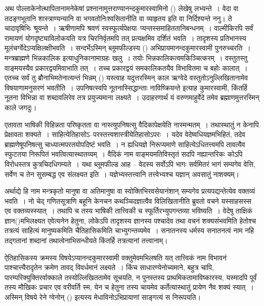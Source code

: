 अथ पोल्लाकेनोत्थापितानामनेकेषां प्रश्नानामुत्तराण्यानन्दकुमारस्वामिनो () लेखेषु लभ्यन्ते~। वेदा वा तदङ्गभूतानि शास्त्राण्यन्यानि वा भगवतो\break निःश्वसितानीति वा व्याहृतय इति वा निर्दिश्यन्ते ननु। ते चादावृषिभिः श्रूयन्ते~। ऋषीणामपि श्रवणं स्वस्फूर्त्यपेक्षया–प्यन्तस्समाहिततानिबन्धनम्~। वाल्मीकिरपि सर्वं रामायणं योगदृष्ट्या\break विलोकयति यत्र चिरनिर्वृतमपि तत् प्रत्यक्षमिव दर्शितं भवति~। तादृशस्य प्रतिभानस्य मूलं\break चर्ग्वेदेऽप्यक्षिलक्षीभवति~। सन्दर्भेऽस्मिन् ब्लूमफील्डस्य () अभिप्रायमानन्दकुमारस्वामी पुनरुच्चरति~। मन्त्रब्राह्मणे भिन्नकालिक इत्याधुनिकानामाग्रहः खलु~। तयोः भिन्नकालिकत्वमकिञ्चित्करम्~। वस्तुतस्तु वाङ्मयस्यैव प्रकारद्वयमिवाभाति तत्~। तच्च प्रकारद्वयं समकालिकतयैव विभावितमा च बहोः कालात्~। एतच्च सर्वं तु ब्रौनाभिमतेनात्यन्तं भिन्नम् () यस्त्वाह यदुत्तरस्मिन् काल ऋग्वेदे वस्तुतोऽनुल्लिखितानामेव विषयाणामनुसरणं भवतीति~। उपनिषत्स्वपि नूतनास्सिद्धान्ताः नाविष्क्रियन्ते इत्याह कुमारस्वामी, किंतर्हि नूतना विभिन्ना वा शब्दावलिरेव तत्र प्रयुज्यमाना लक्ष्यते~। उदाहरणार्थं यं वरुणमाहुर्वेदे तमेव ब्रह्माणमुत्तरस्मिन् काले जगदुः।

एतावता भाषिकी विहिन्नता परिष्कृतता वा नास्त्युपनिषत्सु वैदिकापेक्षयेति नास्मन्मतम्~। तथास्थातुं न केनापि प्रेक्षावता शक्यते~। साहित्येतिहासोऽ–परस्तत्त्वशास्त्रीयेतिहासोऽपरः~। यदेव वेदेष्वधियज्ञमभिहितं, तदेव ब्राह्मणेषूपनिषत्सु चाध्यात्मपरतयोपदिष्टं भवति~। न ह्यधियज्ञे निरूप्यमाणे साहित्येऽधितत्त्वमपि तावत्यैव स्फुटतया निरूपितं भवत्वित्यास्थातव्यम्~। वैदिकं नाम वाङ्मयमतिविस्तृतं सदपि नह्यान्तरिकः कोऽपि विरोधस्तत्र कुत्रचिदधिगम्यते~। यथा ब्लूमफील्ड आह – वेदस्य सर्वोऽपि भागः सर्वमितरं भागं सम्यगेव वेत्ति, सर्वेण च तेन सुसम्बद्ध एव संलक्ष्यत इति~। यज्ञेभ्यस्तत्त्वानि तत्त्वेभ्यश्च यज्ञान् अवसातुं नाशक्यम्।

अर्थाद्ये हि नाम मन्त्रकृतो मानुषा वा अतिमानुषा वा स्वोक्तिभिरवसेयानंशान् सम्यगेव प्रत्यपद्यन्तेत्येव वक्तव्यं भवति~। नो चेद् गणितसूत्राणि बहूनि केनचन कथञ्चिदज्ञात्वैव विलिखितानीति ब्रुवतो वचने यस्साहसस्स एव वक्तव्यस्स्यात्~। तथापि च तस्य भाषिकी तात्त्विकी च स्फूर्तिरभ्युपगन्तव्या भविष्यति~। वेदेषु ताक्षिकं ज्ञान()मभिलक्ष्यत एवेत्यनेन हेतुना, लोकेऽपि तादृशस्य ज्ञानस्य पश्चादेव तथा वचनं शक्यसंभवमिति हेतोश्च तत्रत्यं साहित्यं मानुष्यकमिति चैतिहासिकमिति चाभ्युगन्तव्यमेव~। सनातनस्य धर्मस्य सनातनत्वं नाम नहि तद्गतानां शब्दानां तथात्वेनाभिसन्धीयते किंतर्हि तत्रत्यानां तत्त्वानाम्।

ऐतिहासिकस्य क्रमस्य विषयेऽप्यानन्दकुमारस्वामी वक्तुमेवमभिलषति यत् तात्त्विकं नाम विभावनं पाश्चात्त्यैरादृतेन क्रमेण तावद् विवर्धमानं लक्ष्यते~। किंच साधारण्येनोच्यमाने, बहुत्र चापि, पारम्परिक्युक्तिरर्वाक्काले तस्योल्लिखिततामेव सूचयति, न पुनस्तस्य प्राथमिकतामाविष्कारस्य, यस्मादपि पूर्वं तस्य मौखिकः प्रचार एव वरीवर्ति स्म, येन च हेतुना तस्य चायमेव कर्तेत्यास्थातुं प्रायेण नैव शक्यं स्यात्~। अस्मिन् विषये रेने ग्वेनोन् () इत्यस्य मेधाविनोऽभिप्रायाणां साङ्गत्यं स निरूपयति।

